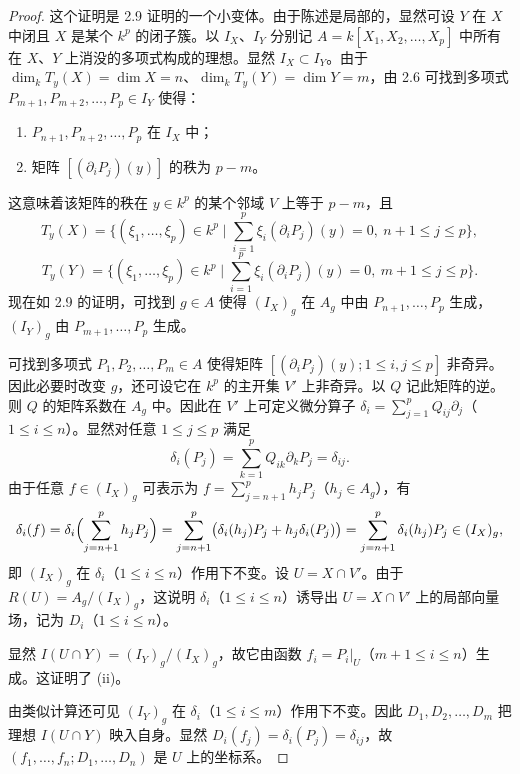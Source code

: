 \begin{proof}
这个证明是 2.9 证明的一个小变体。由于陈述是局部的，显然可设 $Y$ 在 $X$ 中闭且 $X$ 是某个 $k^p$ 的闭子簇。以 $I_X$、$I_Y$ 分别记 $A=k[X_1,X_2,\dots,X_p]$ 中所有在 $X$、$Y$ 上消没的多项式构成的理想。显然 $I_X\subset I_Y$。由于
$\dim_k T_y(X)=\dim X=n$、$\dim_k T_y(Y)=\dim Y=m$，由 2.6 可找到多项式
$P_{m+1},P_{m+2},\dots,P_p\in I_Y$ 使得：
\begin{enumerate}[label=(\alph*)]
  \item $P_{n+1},P_{n+2},\dots,P_p$ 在 $I_X$ 中；
  \item 矩阵 $[(\partial_iP_j)(y)]$ 的秩为 $p-m$。
\end{enumerate}
这意味着该矩阵的秩在 $y\in k^p$ 的某个邻域 $V$ 上等于 $p-m$，且
$$T_y(X)=\{(\xi_1,\dots,\xi_p)\in k^p\mid
\sum_{i=1}^p\xi_i(\partial_iP_j)(y)=0,\ n+1\le j\le p\},$$
$$T_y(Y)=\{(\xi_1,\dots,\xi_p)\in k^p\mid
\sum_{i=1}^p\xi_i(\partial_iP_j)(y)=0,\ m+1\le j\le p\}.$$
现在如 2.9 的证明，可找到 $g\in A$ 使得 $(I_X)_g$ 在 $A_g$ 中由 $P_{n+1},\dots,P_p$ 生成，$(I_Y)_g$ 由 $P_{m+1},\dots,P_p$ 生成。

可找到多项式 $P_1,P_2,\dots,P_m\in A$ 使得矩阵 $[(\partial_iP_j)(y);1\le i,j\le p]$ 非奇异。因此必要时改变 $g$，还可设它在 $k^p$ 的主开集 $V'$ 上非奇异。以 $Q$ 记此矩阵的逆。则 $Q$ 的矩阵系数在 $A_g$ 中。因此在 $V'$ 上可定义微分算子
$\delta_i=\sum_{j=1}^pQ_{ij}\partial_j$（$1\le i\le n$）。显然对任意 $1\le j\le p$ 满足
$$\delta_i(P_j)=\sum_{k=1}^pQ_{ik}\partial_kP_j=\delta_{ij}.$$
由于任意 $f\in(I_X)_g$ 可表示为 $f=\sum_{j=n+1}^ph_jP_j$（$h_j\in A_g$），有
$$\delta_i(f)=\delta_i\Bigl(\sum_{j=n+1}^ph_jP_j\Bigr)
=\sum_{j=n+1}^p\bigl(\delta_i(h_j)P_j+h_j\delta_i(P_j)\bigr)
=\sum_{j=n+1}^p\delta_i(h_j)P_j\in(I_X)_g,$$
即 $(I_X)_g$ 在 $\delta_i$（$1\le i\le n$）作用下不变。设 $U=X\cap V'$。由于 $R(U)=A_g/(I_X)_g$，这说明 $\delta_i$（$1\le i\le n$）诱导出 $U=X\cap V'$ 上的局部向量场，记为 $D_i$（$1\le i\le n$）。

显然 $I(U\cap Y)=(I_Y)_g/(I_X)_g$，故它由函数 $f_i=P_i|_U$（$m+1\le i\le n$）生成。这证明了 (ii)。

由类似计算还可见 $(I_Y)_g$ 在 $\delta_i$（$1\le i\le m$）作用下不变。因此 $D_1,D_2,\dots,D_m$ 把理想 $I(U\cap Y)$ 映入自身。显然 $D_i(f_j)=\delta_i(P_j)=\delta_{ij}$，故 $(f_1,\dots,f_n;D_1,\dots,D_n)$ 是 $U$ 上的坐标系。
\end{proof}

